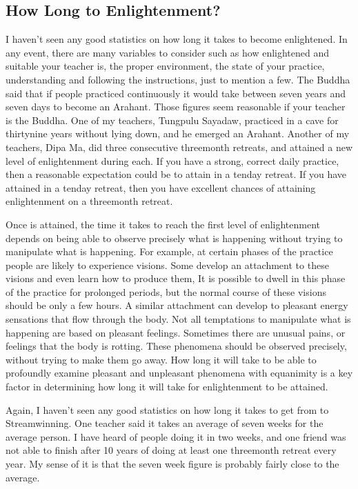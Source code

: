 \documentclass[a5paper,10pt,english]{book}
\begin{document}
\subsection{How Long to Enlightenment?}
\label{\detokenize{saints:how-long-to-enlightenment}}
\sphinxAtStartPar
I haven’t seen any good statistics on how long it takes to become
enlightened. In any event, there are many variables to consider such as
how enlightened and suitable your teacher is, the proper environment,
the state of your practice, understanding and following the
instructions, just to mention a few. The Buddha said that if people
practiced continuously it would take between seven years and seven days
to become an Arahant. Those figures seem reasonable if your teacher is
the Buddha. One of my teachers, Tungpulu Sayadaw, practiced in a cave
for thirty\sphinxhyphen{}nine years without lying down, and he emerged an Arahant.
Another of my teachers, Dipa Ma, did three consecutive three\sphinxhyphen{}month
retreats, and attained a new level of enlightenment during each. If you
have a strong, correct daily practice, then a reasonable expectation
could be to attain  in a ten\sphinxhyphen{}day retreat. If you have
attained  in a ten\sphinxhyphen{}day retreat, then you have excellent
chances of attaining enlightenment on a three\sphinxhyphen{}month retreat.

\sphinxAtStartPar
Once  is attained, the time it takes to reach the first
level of enlightenment depends on being able to observe precisely what
is happening without trying to manipulate what is happening. For
example, at certain phases of the practice people are likely to
experience visions. Some develop an attachment to these visions and even
learn how to produce them, It is possible to dwell in this phase of the
practice for prolonged periods, but the normal course of these visions
should be only a few hours. A similar attachment can develop to pleasant
energy sensations that flow through the body. Not all temptations to
manipulate what is happening are based on pleasant feelings. Sometimes
there are unusual pains, or feelings that the body is rotting. These
phenomena should be observed precisely, without trying to make them go
away. How long it will take to be able to profoundly examine pleasant
and unpleasant phenomena with equanimity is a key factor in determining
how long it will take for enlightenment to be attained.

\sphinxAtStartPar
Again, I haven’t seen any good statistics on how long it takes to get
from  to Stream\sphinxhyphen{}winning. One teacher said it takes an
average of seven weeks for the average person. I have heard of people
doing it in two weeks, and one friend was not able to finish after 10
years of doing at least one three\sphinxhyphen{}month retreat every year. My sense of
it is that the seven week figure is probably fairly close to the
average.
\end{document}
